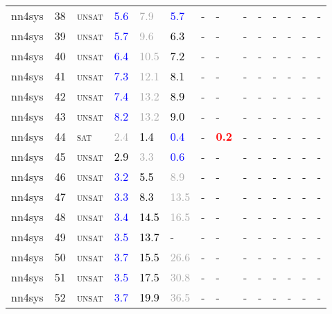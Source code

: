 \begin{center}
{\begin{longtable}{@{}llllllllllllll@{}}
nn4sys & 38 & \textsc{unsat} & \textcolor{blue}{5.6} & \textcolor{darkgray}{7.9} & \textcolor{blue}{5.7} & - & - & - & - & - & - & - & - \\
nn4sys & 39 & \textsc{unsat} & \textcolor{blue}{5.7} & \textcolor{darkgray}{9.6} & \textcolor{black}{6.3} & - & - & - & - & - & - & - & - \\
nn4sys & 40 & \textsc{unsat} & \textcolor{blue}{6.4} & \textcolor{darkgray}{10.5} & \textcolor{black}{7.2} & - & - & - & - & - & - & - & - \\
nn4sys & 41 & \textsc{unsat} & \textcolor{blue}{7.3} & \textcolor{darkgray}{12.1} & \textcolor{black}{8.1} & - & - & - & - & - & - & - & - \\
nn4sys & 42 & \textsc{unsat} & \textcolor{blue}{7.4} & \textcolor{darkgray}{13.2} & \textcolor{black}{8.9} & - & - & - & - & - & - & - & - \\
nn4sys & 43 & \textsc{unsat} & \textcolor{blue}{8.2} & \textcolor{darkgray}{13.2} & \textcolor{black}{9.0} & - & - & - & - & - & - & - & - \\
nn4sys & 44 & \textsc{sat} & \textcolor{darkgray}{2.4} & \textcolor{black}{1.4} & \textcolor{blue}{0.4} & - & \textbf{\textcolor{red}{0.2}} & - & - & - & - & - & - \\
nn4sys & 45 & \textsc{unsat} & \textcolor{black}{2.9} & \textcolor{darkgray}{3.3} & \textcolor{blue}{0.6} & - & - & - & - & - & - & - & - \\
nn4sys & 46 & \textsc{unsat} & \textcolor{blue}{3.2} & \textcolor{black}{5.5} & \textcolor{darkgray}{8.9} & - & - & - & - & - & - & - & - \\
nn4sys & 47 & \textsc{unsat} & \textcolor{blue}{3.3} & \textcolor{black}{8.3} & \textcolor{darkgray}{13.5} & - & - & - & - & - & - & - & - \\
nn4sys & 48 & \textsc{unsat} & \textcolor{blue}{3.4} & \textcolor{black}{14.5} & \textcolor{darkgray}{16.5} & - & - & - & - & - & - & - & - \\
nn4sys & 49 & \textsc{unsat} & \textcolor{blue}{3.5} & \textcolor{black}{13.7} & - & - & - & - & - & - & - & - & - \\
nn4sys & 50 & \textsc{unsat} & \textcolor{blue}{3.7} & \textcolor{black}{15.5} & \textcolor{darkgray}{26.6} & - & - & - & - & - & - & - & - \\
nn4sys & 51 & \textsc{unsat} & \textcolor{blue}{3.5} & \textcolor{black}{17.5} & \textcolor{darkgray}{30.8} & - & - & - & - & - & - & - & - \\
nn4sys & 52 & \textsc{unsat} & \textcolor{blue}{3.7} & \textcolor{black}{19.9} & \textcolor{darkgray}{36.5} & - & - & - & - & - & - & - & - \\

\end{longtable}}
\end{center}
